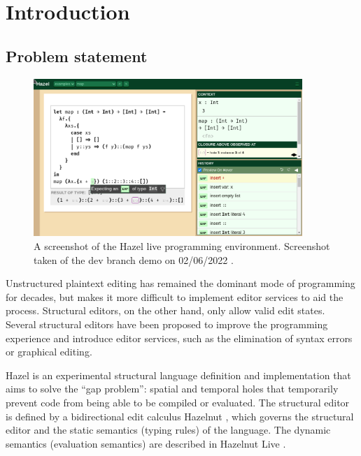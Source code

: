 \chapter{Introduction}
\label{sec:introduction}

\section{Problem statement}
\label{sec:prob_stmt}

\begin{figure}
  \centering
  \includegraphics[width=4in]{img/hazel_ui.png}
  \caption[Screenshot of the Hazel live programming environment.]{A screenshot of the Hazel live programming environment. Screenshot taken of the dev branch demo on 02/06/2022 \cite{HazelDemo2022}.}
  \label{fig:screenshot-hazel-ui}
\end{figure}

Unstructured plaintext editing has remained the dominant mode of programming for decades, but makes it more difficult to implement editor services to aid the process. Structural editors, on the other hand, only allow valid edit states. Several structural editors \cite{miller1994evolution,maloney2010scratch} have been proposed to improve the programming experience and introduce editor services, such as the elimination of syntax errors or graphical editing.

Hazel \cite{Hazel2022} is an experimental structural language definition and implementation that aims to solve the ``gap problem'': spatial and temporal holes that temporarily prevent code from being able to be compiled or evaluated. The structural editor is defined by a bidirectional edit calculus Hazelnut \cite{conf/popl/Hazelnut17}, which governs the structural editor and the static semantics (typing rules) of the language. The dynamic semantics (evaluation semantics) are described in Hazelnut Live \cite{conf/popl/HazelnutLive19}.

